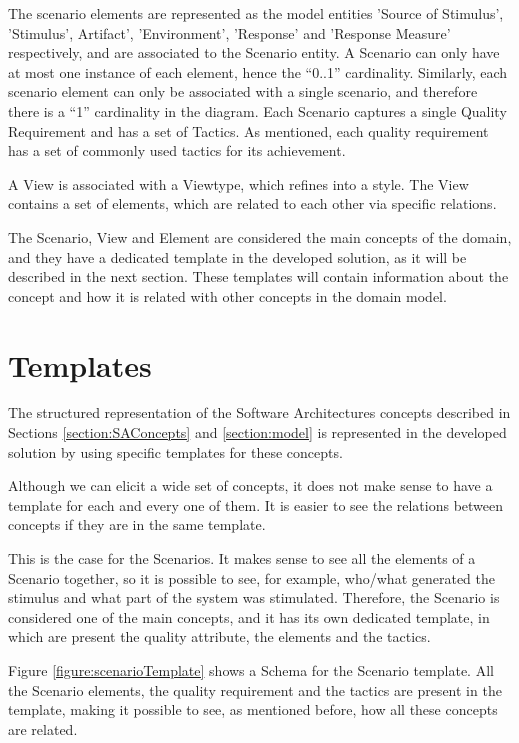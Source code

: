 The scenario elements are represented as the model entities 'Source of Stimulus', 'Stimulus', Artifact', 'Environment', 'Response' and 'Response Measure' respectively, and are associated to the Scenario entity. A Scenario can only have at most one instance of each element, hence the ``0..1'' cardinality. Similarly, each scenario element can only be associated with a single scenario, and therefore there is a ``1'' cardinality in the diagram. Each Scenario captures a single Quality Requirement and has a set of Tactics. As mentioned, each quality requirement has a set of commonly used tactics for its achievement.

A View is associated with a Viewtype, which refines into a style. The View contains a set of elements, which are related to each other via specific relations.

The Scenario, View and Element are considered the main concepts of the domain, and they have a dedicated template in the developed solution, as it will be described in the next section. These templates will contain information about the concept and how it is related with other concepts in the domain model.

\section{Templates}
\label{section:templates}
The structured representation of the Software Architectures concepts described in Sections \ref{section:SAConcepts} and \ref{section:model} is represented in the developed solution by using specific templates for these concepts.

Although we can elicit a wide set of concepts, it does not make sense to have a template for each and every one of them. It is easier to see the relations between concepts if they are in the same template. 

This is the case for the Scenarios. It makes sense to see all the elements of a Scenario together, so it is possible to see, for example, who/what generated the stimulus and what part of the system was stimulated. Therefore, the Scenario is considered one of the main concepts, and it has its own dedicated template, in which are present the quality attribute, the elements and the tactics. 

Figure \ref{figure:scenarioTemplate} shows a Schema for the Scenario template. All the Scenario elements, the quality requirement and the tactics are present in the template, making it possible to see, as mentioned before, how all these concepts are related.


